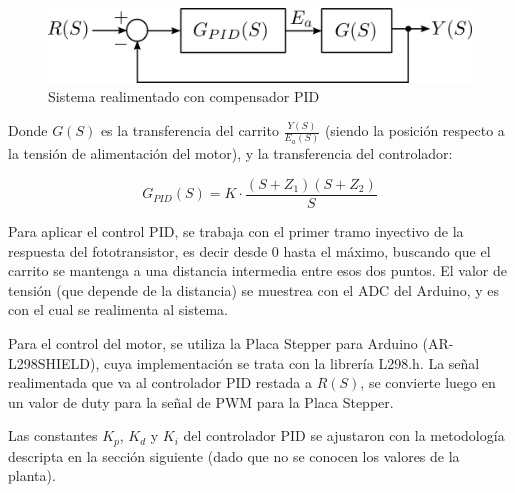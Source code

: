 \documentclass{article}
\begin{document}
\begin{figure}[H]
\centering
\includegraphics[width=0.7\linewidth]{images/bloquesPID.png}
\caption{Sistema realimentado con compensador PID}
\label{fig:carrito}
\end{figure}

Donde $G(S)$ es la transferencia del carrito $\frac{Y(S)}{E_a(S)}$ (siendo la posición respecto a la tensión de alimentación del motor), y la transferencia del controlador:

\[
G_{PID}(S) = K \cdot \frac{(S+Z_1)(S+Z_2)}{S}
\]

Para aplicar el control PID, se trabaja con el primer tramo inyectivo de la respuesta del fototransistor, es decir desde 0 hasta el máximo, buscando que el carrito se mantenga a una distancia intermedia entre esos dos puntos. El valor de tensión (que depende de la distancia) se muestrea con el ADC del Arduino, y es con el cual se realimenta al sistema.\par
Para el control del motor, se utiliza la Placa Stepper para Arduino (AR-L298SHIELD), cuya implementación se trata con la librería L298.h. La señal realimentada que va al controlador PID restada a $R(S)$, se convierte luego en un valor de duty para la señal de PWM para la Placa Stepper.\par
Las constantes $K_p$, $K_d$ y $K_i$ del controlador PID se ajustaron con la metodología descripta en la sección siguiente (dado que no se conocen los valores de la planta).
\end{document}

